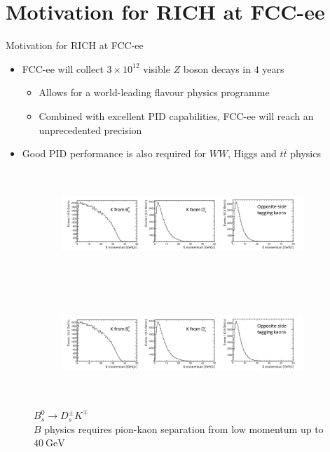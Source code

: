 \documentclass{beamer}
\begin{document}
\section{Motivation for RICH at FCC-ee}
\begin{frame}{Motivation for RICH at FCC-ee}
  \begin{itemize}
    \setlength\itemsep{1.0em}
    \item{FCC-ee will collect $3\times 10^{12}$ visible $Z$ boson decays in $4$ years}
    \begin{itemize}
      \item{Allows for a world-leading flavour physics programme}
      \item{Combined with excellent PID capabilities, FCC-ee will reach an unprecedented precision}
    \end{itemize}
    \item{Good PID performance is also required for $WW$, Higgs and $t\bar{t}$ physics}
  \end{itemize}
  \begin{figure}
    \centering
    \vspace{-0.2cm}
    \begin{subfigure}{0.5\textwidth}
      \includegraphics[height = 4cm, trim = {0 0 22.5cm 0}, clip = true]{Plots/p_spectrum_crop.png}
    \end{subfigure}%
    \begin{subfigure}{0.5\textwidth}
      \includegraphics[height = 4cm, trim = {22.0cm 0 0 0}, clip = true]{Plots/p_spectrum_crop.png}
    \end{subfigure}
    \caption{$B_s^0\to D_s^\pm K^\mp$\\$B$ physics requires pion-kaon separation from low momentum up to $\SI{40}{\giga\eV}$}
  \end{figure}
\end{frame}
\end{document}
